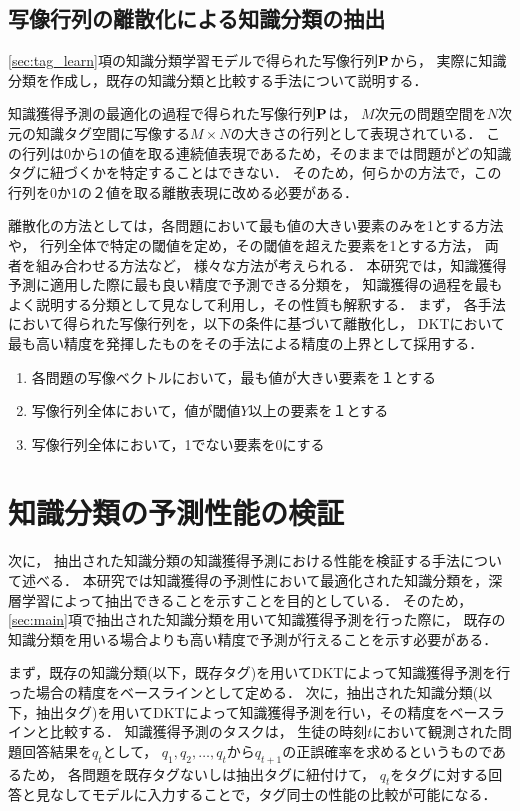 \subsection{写像行列の離散化による知識分類の抽出}
\ref{sec:tag_learn}項の知識分類学習モデルで得られた写像行列${\bf P}$から，
実際に知識分類を作成し，既存の知識分類と比較する手法について説明する．


知識獲得予測の最適化の過程で得られた写像行列${\bf P}$は，
$M$次元の問題空間を$N$次元の知識タグ空間に写像する$M \times N$の大きさの行列として表現されている．
この行列は0から1の値を取る連続値表現であるため，そのままでは問題がどの知識タグに紐づくかを特定することはできない．
そのため，何らかの方法で，この行列を0か1の２値を取る離散表現に改める必要がある．

離散化の方法としては，各問題において最も値の大きい要素のみを1とする方法や，
行列全体で特定の閾値を定め，その閾値を超えた要素を1とする方法，
両者を組み合わせる方法など，
様々な方法が考えられる．
本研究では，知識獲得予測に適用した際に最も良い精度で予測できる分類を，
知識獲得の過程を最もよく説明する分類として見なして利用し，その性質も解釈する．
まず，
各手法において得られた写像行列を，以下の条件に基づいて離散化し，
DKTにおいて最も高い精度を発揮したものをその手法による精度の上界として採用する．
\begin{enumerate}
\item 各問題の写像ベクトルにおいて，最も値が大きい要素を１とする
\item 写像行列全体において，値が閾値$Y$以上の要素を１とする
\item 写像行列全体において，1でない要素を0にする
\end{enumerate}


\section{知識分類の予測性能の検証}
次に，
抽出された知識分類の知識獲得予測における性能を検証する手法について述べる．
本研究では知識獲得の予測性において最適化された知識分類を，深層学習によって抽出できることを示すことを目的としている．
そのため，\ref{sec:main}項で抽出された知識分類を用いて知識獲得予測を行った際に，
既存の知識分類を用いる場合よりも高い精度で予測が行えることを示す必要がある．


まず，既存の知識分類(以下，既存タグ)を用いてDKTによって知識獲得予測を行った場合の精度をベースラインとして定める．
次に，抽出された知識分類(以下，抽出タグ)を用いてDKTによって知識獲得予測を行い，その精度をベースラインと比較する．
知識獲得予測のタスクは，
生徒の時刻$t$において観測された問題回答結果を$q_{t}$として，
$q_1, q_2, \dots, q_t$から$q_{t+1}$の正誤確率を求めるというものであるため，
各問題を既存タグないしは抽出タグに紐付けて，
$q_{t}$をタグに対する回答と見なしてモデルに入力することで，タグ同士の性能の比較が可能になる．

